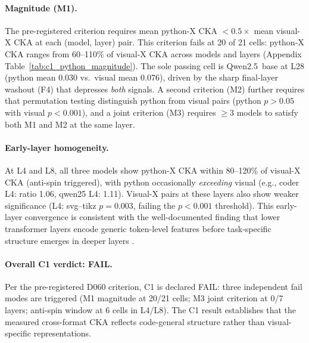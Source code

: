 \paragraph{Magnitude (M1).}
The pre-registered criterion requires mean python-X CKA $< 0.5 \times$ mean visual-X CKA at each (model, layer) pair.
This criterion fails at 20 of 21 cells: python-X CKA ranges from 60--110\% of visual-X CKA across models and layers (Appendix Table~\ref{tab:c1_python_magnitude}).
The sole passing cell is Qwen2.5~base at L28 (python mean 0.030 vs.\ visual mean 0.076), driven by the sharp final-layer washout (F4) that depresses \emph{both} signals.
A second criterion (M2) further requires that permutation testing distinguish python from visual pairs (python $p > 0.05$ with visual $p < 0.001$), and a joint criterion (M3) requires $\geq 3$ models to satisfy both M1 and M2 at the same layer.

\paragraph{Early-layer homogeneity.}
At L4 and L8, all three models show python-X CKA within 80--120\% of visual-X CKA (anti-spin triggered), with python occasionally \emph{exceeding} visual (e.g., coder L4: ratio 1.06, qwen25 L4: 1.11).
Visual-X pairs at these layers also show weaker significance (L4: svg--tikz $p = 0.003$, failing the $p < 0.001$ threshold).
This early-layer convergence is consistent with the well-documented finding that lower transformer layers encode generic token-level features before task-specific structure emerges in deeper layers \cite{jawahar2019bert, tenney2019bert}.

\paragraph{Overall C1 verdict: FAIL.}
Per the pre-registered D060 criterion, C1 is declared FAIL: three independent fail modes are triggered (M1 magnitude at 20/21 cells; M3 joint criterion at 0/7 layers; anti-spin window at 6 cells in L4/L8).
The C1 result establishes that the measured cross-format CKA reflects code-general structure rather than visual-specific representations.

